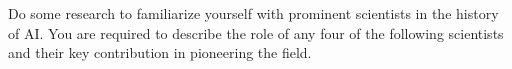 \documentclass[answers]{exam}
\begin{document}
\begin{questions}
    \question
    Do some research to familiarize yourself with prominent scientists in the history of AI.
    You are required to describe the role of any four of the following scientists and their key contribution in
    pioneering the field.

\end{questions}
\end{document}
